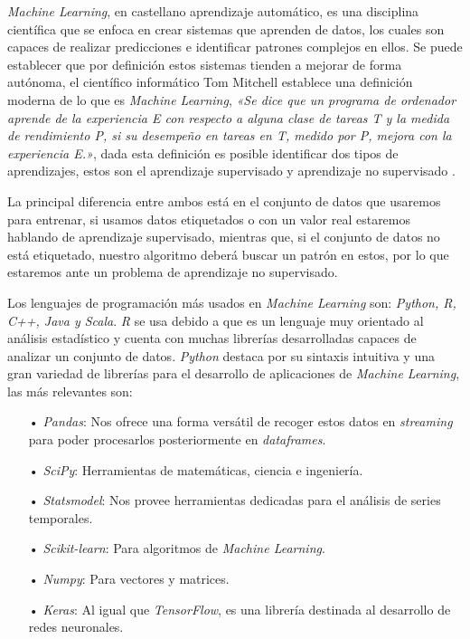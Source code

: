 \textit{Machine Learning}, en castellano aprendizaje automático, es una disciplina científica que se enfoca en crear sistemas que aprenden de datos, los cuales son capaces de realizar predicciones e identificar patrones complejos en ellos. Se puede establecer que por definición estos sistemas tienden a mejorar de forma autónoma, el científico informático Tom Mitchell establece una definición moderna de lo que es \textit{Machine Learning}, \textit{«Se dice que un programa de ordenador aprende de la experiencia E con respecto a alguna clase de tareas T y la medida de rendimiento P, si su desempeño en tareas en T, medido por P, mejora con la experiencia E.»}, dada esta definición es posible identificar dos tipos de aprendizajes, estos son el aprendizaje supervisado y aprendizaje no supervisado \cite{RodriguezGonzalez2018}. 

La principal diferencia entre ambos está en el conjunto de datos que usaremos para entrenar, si usamos datos etiquetados o con un valor real estaremos hablando de aprendizaje supervisado, mientras que, si el conjunto de datos no está etiquetado, nuestro algoritmo deberá buscar un patrón en estos, por lo que estaremos ante un problema de aprendizaje no supervisado.

Los lenguajes de programación más usados en \textit{Machine Learning} son: \textit{Python, R, C++, Java y Scala}. \textit{R} se usa debido a que es un lenguaje muy orientado al análisis estadístico y cuenta con muchas librerías desarrolladas capaces de analizar un conjunto de datos. \textit{Python} destaca por su sintaxis intuitiva y una gran variedad de librerías para el desarrollo de aplicaciones de \textit{Machine Learning}, las más relevantes son: 

\begin{itemize}
\item[•] \textit{Pandas}: Nos ofrece una forma versátil de recoger estos datos en \textit{streaming} para poder procesarlos posteriormente en \textit{dataframes}.
\item[•] \textit{SciPy}: Herramientas de matemáticas, ciencia e ingeniería. 
\item[•] \textit{Statsmodel}: Nos provee herramientas dedicadas para el análisis de series temporales.
\item[•] \textit{Scikit-learn}: Para algoritmos de \textit{Machine Learning}. 
\item[•] \textit{Numpy}: Para vectores y matrices.
\item[•] \textit{Keras}: Al igual que \textit{TensorFlow}, es una librería destinada al desarrollo de redes neuronales.
\end{itemize}

